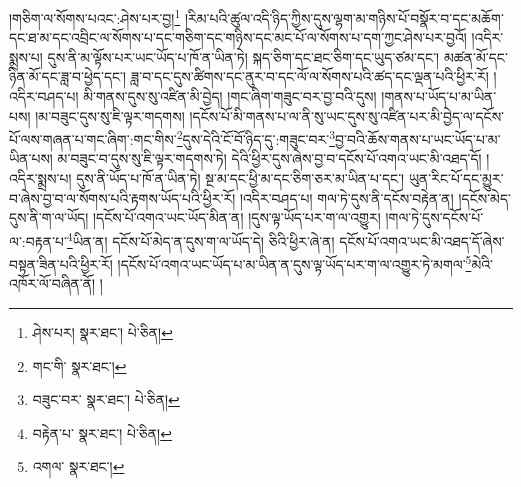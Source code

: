 །གཅིག་ལ་སོགས་པའང་:ཤེས་པར་བྱ།\footnote{ཤེས་པར།  སྣར་ཐང་།  པེ་ཅིན། } །རིམ་པའི་ཚུལ་འདི་ཉིད་ཀྱིས་དུས་ལྷག་མ་གཉིས་པོ་བསྣོར་བ་དང་མཆོག་དང་ཐ་མ་དང་འབྲིང་ལ་སོགས་པ་དང་གཅིག་དང་གཉིས་དང་མང་པོ་ལ་སོགས་པ་དག་ཀྱང་ཤེས་པར་བྱའོ། །འདིར་སྨྲས་པ། དུས་ནི་མ་ལྟོས་པར་ཡང་ཡོད་པ་ཁོ་ན་ཡིན་ཏེ། སྐད་ཅིག་དང་ཐང་ཅིག་དང་ཡུད་ཙམ་དང་། མཚན་མོ་དང་ཉིན་མོ་དང་ཟླ་བ་ཕྱེད་དང་། ཟླ་བ་དང་དུས་ཚིགས་དང་ནུར་བ་དང་ལོ་ལ་སོགས་པའི་ཚད་དང་ལྡན་པའི་ཕྱིར་རོ། །འདིར་བཤད་པ། མི་གནས་དུས་སུ་འཛིན་མི་བྱེད། །གང་ཞིག་གཟུང་བར་བྱ་བའི་དུས། །གནས་པ་ཡོད་པ་མ་ཡིན་པས། །མ་བཟུང་དུས་སུ་ཇི་ལྟར་གདགས། །དངོས་པོ་མི་གནས་པ་ལ་ནི་སུ་ཡང་དུས་སུ་འཛིན་པར་མི་བྱེད་ལ་དངོས་པོ་ལས་གཞན་པ་གང་ཞིག་:གང་གིས་\footnote{གང་གི་  སྣར་ཐང་། }དུས་དེའི་ངོ་བོ་ཉིད་དུ་:གཟུང་བར་\footnote{བཟུང་བར་  སྣར་ཐང་།  པེ་ཅིན། }བྱ་བའི་ཆོས་གནས་པ་ཡང་ཡོད་པ་མ་ཡིན་པས། མ་བཟུང་བ་དུས་སུ་ཇི་ལྟར་གདགས་ཏེ། དེའི་ཕྱིར་དུས་ཞེས་བྱ་བ་དངོས་པོ་འགའ་ཡང་མི་འཐད་དོ། །འདིར་སྨྲས་པ། དུས་ནི་ཡོད་པ་ཁོ་ན་ཡིན་ཏེ། སྔ་མ་དང་ཕྱི་མ་དང་ཅིག་ཅར་མ་ཡིན་པ་དང་། ཡུན་རིང་པོ་དང་མྱུར་བ་ཞེས་བྱ་བ་ལ་སོགས་པའི་རྟགས་ཡོད་པའི་ཕྱིར་རོ། །འདིར་བཤད་པ། གལ་ཏེ་དུས་ནི་དངོས་བརྟེན་ན། །དངོས་མེད་དུས་ནི་ག་ལ་ཡོད། །དངོས་པོ་འགའ་ཡང་ཡོད་མིན་ན། །དུས་ལྟ་ཡོད་པར་ག་ལ་འགྱུར། །གལ་ཏེ་དུས་དངོས་པོ་ལ་:བརྟན་པ་\footnote{བརྟེན་པ་  སྣར་ཐང་།  པེ་ཅིན། }ཡིན་ན། དངོས་པོ་མེད་ན་དུས་ག་ལ་ཡོད་དེ། ཅིའི་ཕྱིར་ཞེ་ན། དངོས་པོ་འགའ་ཡང་མི་འཐད་དོ་ཞེས་བསྟན་ཟིན་པའི་ཕྱིར་རོ། །དངོས་པོ་འགའ་ཡང་ཡོད་པ་མ་ཡིན་ན་དུས་ལྟ་ཡོད་པར་ག་ལ་འགྱུར་ཏེ་མགལ་\footnote{འགལ་  སྣར་ཐང་། }མེའི་འཁོར་ལོ་བཞིན་ནོ། །
